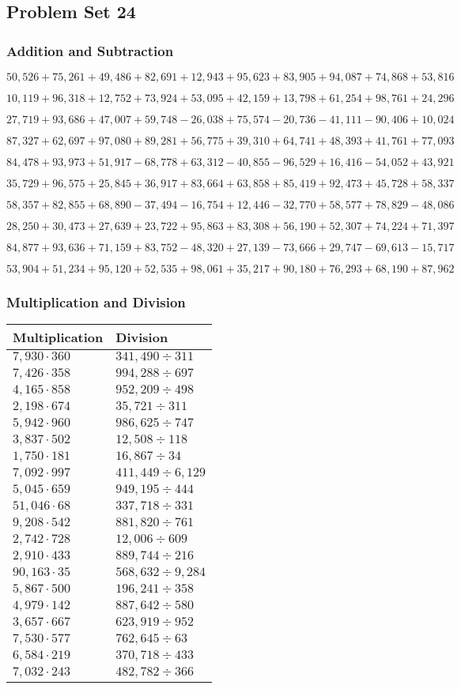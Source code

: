\hypertarget{problem-set-24-4}{%
\subsection{Problem Set 24}\label{problem-set-24-4}}

\hypertarget{addition-and-subtraction-246}{%
\subsubsection{Addition and
Subtraction}\label{addition-and-subtraction-246}}

\(50,526+75,261+49,486+82,691+12,943+95,623+83,905+94,087+74,868+ 53,816\)

\(10,119+96,318+12,752+73,924+53,095+42,159+13,798+61,254+98,761+24,296\)

\(27,719+93,686+47,007+59,748-26,038+75,574-20,736-41,111-90,406+10,024\)

\(87,327+62,697+97,080+89,281+56,775+39,310+64,741+48,393+41,761+77,093\)

\(84,478+93,973+51,917-68,778+63,312-40,855-96,529+16,416-54,052+43,921\)

\(35,729+96,575+25,845+36,917+83,664+63,858+85,419+92,473+45,728+58,337\)

\(58,357+82,855+68,890-37,494-16,754+12,446-32,770+58,577+78,829-48,086\)

\(28,250+30,473+27,639+23,722+95,863+83,308+56,190+52,307+74,224+71,397\)

\(84,877+93,636+71,159+83,752-48,320+27,139-73,666+29,747-69,613-15,717\)

\(53,904+51,234+95,120+52,535+98,061+35,217+90,180+76,293+68,190+87,962\)

\hypertarget{multiplication-and-division-245}{%
\subsubsection{Multiplication and
Division}\label{multiplication-and-division-245}}

\begin{longtable}[]{@{}ll@{}}
\toprule
Multiplication & Division\tabularnewline
\midrule
\endhead
\(7,930\cdot360\) & \(341,490÷311\)\tabularnewline
\(7,426\cdot358\) & \(994,288÷697\)\tabularnewline
\(4,165\cdot858\) & \(952,209 ÷498\)\tabularnewline
\(2,198\cdot674\) & \(35,721÷311\)\tabularnewline
\(5,942\cdot960\) & \(986,625÷747\)\tabularnewline
\(3,837\cdot502\) & \(12,508÷118\)\tabularnewline
\(1,750\cdot181\) & \(16,867÷34\)\tabularnewline
\(7,092\cdot997\) & \(411,449÷6,129\)\tabularnewline
\(5,045\cdot659\) & \(949,195÷444\)\tabularnewline
\(51,046\cdot68\) & \(337,718÷331\)\tabularnewline
\(9,208\cdot542\) & \(881,820÷761\)\tabularnewline
\(2,742\cdot728\) & \(12,006÷609\)\tabularnewline
\(2,910\cdot433\) & \(889,744÷216\)\tabularnewline
\(90,163\cdot35\) & \(568,632÷9,284\)\tabularnewline
\(5,867\cdot500\) & \(196,241÷358\)\tabularnewline
\(4,979\cdot142\) & \(887,642÷580\)\tabularnewline
\(3,657\cdot667\) & \(623,919÷952\)\tabularnewline
\(7,530\cdot577\) & \(762,645÷63\)\tabularnewline
\(6,584\cdot219\) & \(370,718÷433\)\tabularnewline
\(7,032\cdot243\) & \(482,782÷366\)\tabularnewline
\bottomrule
\end{longtable}

